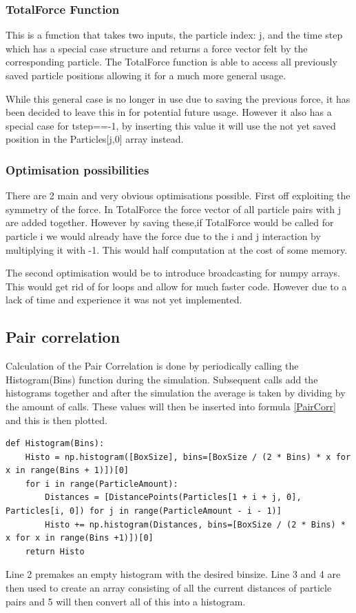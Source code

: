 \documentclass[a4paper,12pt]{article} %
\begin{document}
\subsubsection{TotalForce Function}
This is a function that takes two inputs, the particle index: j, and the time step which has a special case structure and returns a force vector felt by the corresponding particle. The TotalForce function is able to access all previously saved particle positions allowing it for a much more general usage.\par
While this general case is no longer in use due to saving the previous force, it has been decided to leave this in for potential future usage. However it also has a special case for tstep==-1, by inserting this value it will use the not yet saved position in the Particles[j,0] array instead.\par
\subsubsection{Optimisation possibilities}
There are 2 main and very obvious optimisations possible. First off exploiting the symmetry of the force. In TotalForce the force vector of all particle pairs with j are added together. However by saving these,if TotalForce would be called for particle i we would already have the force due to the i and j interaction by multiplying it with -1. This would half computation at the cost of some memory.\par
The second optimisation would be to introduce broadcasting for numpy arrays. This would get rid of for loops and allow for much faster code. However due to a lack of time and experience it was not yet implemented.
\subsection{Pair correlation}
Calculation of the Pair Correlation is done by periodically calling the Histogram(Bins) function during the simulation. Subsequent calls add the histograms together and after the simulation the average is taken by dividing by the amount of calls. These values will then be inserted into formula \eqref{PairCorr} and this is then plotted.
\small
\begin{lstlisting}
def Histogram(Bins):
    Histo = np.histogram([BoxSize], bins=[BoxSize / (2 * Bins) * x for x in range(Bins + 1)])[0]
    for i in range(ParticleAmount):
        Distances = [DistancePoints(Particles[1 + i + j, 0], Particles[i, 0]) for j in range(ParticleAmount - i - 1)]
        Histo += np.histogram(Distances, bins=[BoxSize / (2 * Bins) * x for x in range(Bins +1)])[0]
    return Histo
\end{lstlisting}
\normalsize
Line 2 premakes an empty histogram with the desired binsize. Line 3 and 4 are then used to create an array consisting of all the current distances of particle pairs and 5 will then convert all of this into a histogram.
\end{document}
